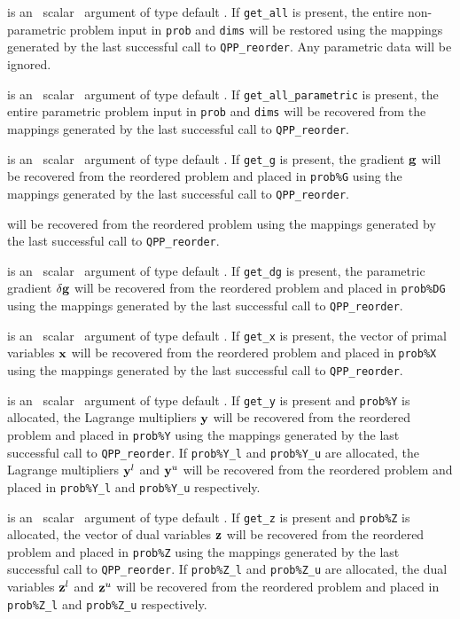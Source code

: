 \documentclass{galahad}
\newcommand{\packagename}{QPP}
\begin{document}
\begin{description}
is an \optional\ scalar \intentin\ argument of type default \logical.
If {\tt get\_all} is present, the entire non-parametric problem
input in {\tt prob} and {\tt dims} will be restored using the
mappings generated by the last successful call to {\tt \packagename\_reorder}.
Any parametric data will be ignored.

is an \optional\ scalar \intentin\ argument of type default \logical.
If {\tt get\_all\_parametric} is present, the entire parametric problem
input in {\tt prob} and {\tt dims} will be recovered from the
mappings generated by the last successful call to {\tt \packagename\_reorder}.

is an \optional\ scalar \intentin\ argument of type default \logical.
If {\tt get\_g} is present, the gradient ${\mathbf{g}}$
will be recovered from  the reordered problem and placed in {\tt prob\%G}
using the mappings generated by the last successful call to
{\tt \packagename\_reorder}.

will be recovered from  the reordered problem using the
mappings generated by the last successful call to {\tt \packagename\_reorder}.

is an \optional\ scalar \intentin\ argument of type default \logical.
If {\tt get\_dg} is present, the parametric gradient $\delta {\mathbf{g}}$
will be recovered from  the reordered problem and placed in {\tt prob\%DG}
using the mappings generated by the last successful call to
{\tt \packagename\_reorder}.

is an \optional\ scalar \intentin\ argument of type default \logical.
If {\tt get\_x} is present, the vector of primal variables ${\mathbf{x}}$
will be recovered from  the reordered problem and placed in {\tt prob\%X}
using the mappings generated by the last successful call to
{\tt \packagename\_reorder}.

is an \optional\ scalar \intentin\ argument of type default \logical.
If {\tt get\_y} is present and {\tt prob\%Y} is allocated,
the Lagrange multipliers
${\mathbf{y}}$ will be recovered from  the reordered problem and placed in {\tt prob\%Y}
using the mappings generated by the last successful call to
{\tt \packagename\_reorder}. If {\tt prob\%Y\_l} and {\tt prob\%Y\_u}
are allocated, the Lagrange multipliers
${\mathbf{y}}^l$ and ${\mathbf{y}}^u$ will be recovered from  the reordered problem and
placed in {\tt prob\%Y\_l} and {\tt prob\%Y\_u} respectively.

is an \optional\ scalar \intentin\ argument of type default \logical.
If {\tt get\_z} is present and {\tt prob\%Z} is allocated,
the vector of dual variables ${\mathbf{z}}$
will be recovered from  the reordered problem and placed in {\tt prob\%Z}
using the mappings generated by the last successful call to
{\tt \packagename\_reorder}. If {\tt prob\%Z\_l} and {\tt prob\%Z\_u}
are allocated, the dual variables
${\mathbf{z}}^l$ and ${\mathbf{z}}^u$ will be recovered from  the reordered problem and
placed in {\tt prob\%Z\_l} and {\tt prob\%Z\_u} respectively.


\end{description}
\end{document}
